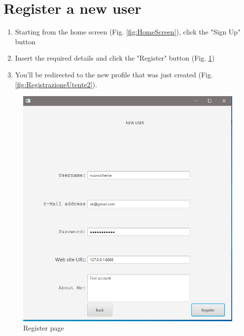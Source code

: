 \documentclass[11pt]{report}
\begin{document}
\section{Register a new user}
\begin{enumerate}
    \item Starting from the home screen (Fig. \ref{fig:HomeScreen}), click the "Sign Up" button
    \item Insert the required details and click the "Register" button (Fig. \ref{fig:RegistrazioneUtente1})
    \item You'll be redirected to the new profile that was just created (Fig. \ref{fig:RegistrazioneUtente2}).
\end{enumerate}
\begin{figure}[H]
  \centering
  \includegraphics[width=\textwidth,keepaspectratio=true]{img/user_manual/RegistrazioneUtente1.png}
  \caption{Register page}
  \label{fig:RegistrazioneUtente1}
\end{figure}
\end{document}
